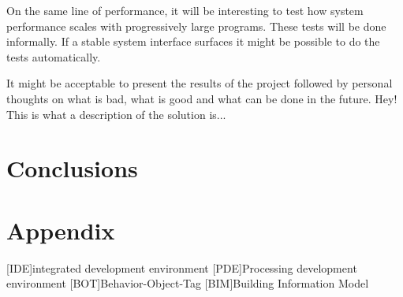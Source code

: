 \documentclass{./llncs2e/llncs}
\begin{document}
	On the same line of performance, it will be interesting to test how system performance scales with progressively large programs.
	These tests will be done informally. 
	If a stable system interface surfaces it might be possible to do the tests automatically.

	It might be acceptable to present the results of the project followed by personal thoughts on what is bad, what is good and what can be done in the future.
	Hey! This is what a description of the solution is...


\section{Conclusions}

\newpage
\appendix
\section{Appendix}
\label{sec:attachments}

\begin{acronym}
	[IDE]{integrated development environment}
	[PDE]{Processing development environment}
	[BOT]{Behavior-Object-Tag}
	[BIM]{Building Information Model}
\end{acronym}

% 
% 
 

 
\end{document}
